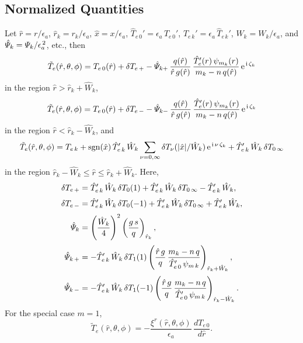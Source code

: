 \documentclass[12pt,prb,aps,notitlepage]{revtex4-1}
\begin{document}
\subsection{Normalized Quantities}
Let $\hat{r}=r/\epsilon_a$, $\hat{r}_k=r_k/\epsilon_a$, $\hat{x}= x/\epsilon_a$, $\hat{T}_{e\,0}' = \epsilon_a\,T_{e\,0}'$, $\hat{T}_{e\,k}'=\epsilon_a\,\hat{T}_{e\,k}'$, 
$\hat{W}_k = W_k/\epsilon_a$, and $\hat{\mit\Psi}_k={\mit\Psi}_k/\epsilon_a^{\,2}$, etc., 
then
\begin{equation}
\tilde{T}_e(\hat{r},\theta,\phi) = T_{e\,0}(\hat{r}) + \delta T_{e\,+} - \hat{\mit\Psi}_{k+}\,\frac{q(\hat{r})}{\hat{r}\,g(\hat{r})}\,\frac{\hat{T}_e'(r)\,\psi_{m_k}(r)}{m_k-n\,q(\hat{r})}\,{\rm e}^{\,{\rm i}\,\zeta_k}
\end{equation}
in the region $\hat{r}>\hat{r}_k+\hat{W}_k$, 
\begin{equation}
\tilde{T}_e(\hat{r},\theta,\phi) = T_{e\,0}(\hat{r}) + \delta T_{e\,-} - \hat{{\mit\Psi}}_{k-}\,\frac{q(\hat{r})}{\hat{r}\,g(\hat{r})}\,\frac{\hat{T}_e'(r)\,\psi_{m_k}(r)}{m_k-n\,q(\hat{r})}\,{\rm e}^{\,{\rm i}\,\zeta_k}
\end{equation}
in the region $\hat{r}< \hat{r}_k-\hat{W}_k$, and 
\begin{equation}
\tilde{T}_e(\hat{r}, \theta,\phi)=T_{e\,k} +{\rm sgn}(\hat{x})\,\hat{T}_{e\,k}'\,\hat{W}_k\sum_{\nu=0,\infty}\delta T_\nu(|\hat{x}|/\hat{W}_k)\,{\rm e}^{\,{\rm i}\,\nu\,\zeta_k}+\hat{T}_{e\,k}'\,\hat{W}_k\,\delta T_{0\,\infty}
\end{equation}
in the region $\hat{r}_k-\hat{W}_k \leq \hat{r}\leq \hat{r}_k+\hat{W}_k$. Here, 
\begin{align}
\delta T_{e\,+} &= \hat{T}_{e\,k}'\,\hat{W}_k\,\delta T_0(1)+\hat{T}_{e\,k}'\,\hat{W}_k\,\delta T_{0\,\infty} - \hat{T}_{e\,k}'\,\hat{W}_k,\\[0.5ex]
\delta T_{e\,-} &=\hat{T}_{e\,k}'\,\hat{W}_k\,\delta T_0(-1) +\hat{T}_{e\,k}'\,\hat{W}_k\,\delta T_{0\,\infty} +\hat{T}_{e\,k}'\,\hat{W}_k,\\[0.5ex]
\hat{\mit\Psi}_k&=\left(\frac{\hat{W}_k}{4}\right)^2\left(\frac{g\,s}{q}\right)_{\hat{r}_k},\\[0.5ex]
\hat{\mit\Psi}_{k\,+} &= - \hat{T}_{e\,k}'\,\hat{W}_k\,\delta T_1(1)\left(\frac{\hat{r}\,g}{q}\,\frac{m_k-n\,q}{\hat{T}_{e\,0}'\,\psi_{m\,k}}\right)_{\hat{r}_k+\hat{W}_k},\\[0.5ex]
\hat{\mit\Psi}_{k\,-} &= -\hat{T}_{e\,k}'\,\hat{W}_k\,\delta T_1(-1)\left(\frac{\hat{r}\,g}{q}\,\frac{m_k-n\,q}{\hat{T}_{e\,0}'\,\psi_{m\,k}}\right)_{\hat{r}_k-\hat{W}_k}.
\end{align}
For the special case $m=1$, 
\begin{equation}
\tilde{T}_e(\hat{r},\theta,\phi) = - \frac{\xi^r(\hat{r},\theta,\phi)}{\epsilon_a}\,\frac{ dT_{e\,0}}{d\hat{r}}.
\end{equation}
\end{document}
